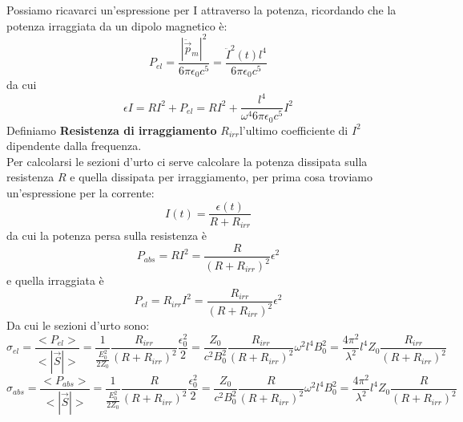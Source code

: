 \documentclass[twoside]{article}
\begin{document}
Possiamo ricavarci un'espressione per I attraverso la potenza, ricordando che la potenza irraggiata da un dipolo magnetico è:
\begin{equation}
    P_{el}=\frac{|\ddot{\vec{p}}_m|^2}{6\pi\epsilon_0c^5}=\frac{\ddot{I}^2(t)l^4}{6\pi\epsilon_0c^5}
\end{equation}
da cui
\begin{equation}
    \epsilon I=RI^2+P_{el}=RI^2+\frac{l^4}{\omega^4 6\pi\epsilon_0c^5}I^2
\end{equation}
Definiamo \textbf{Resistenza di irraggiamento} $R_{irr}$l'ultimo coefficiente di $I^2$ dipendente dalla frequenza. \\
Per calcolarsi le sezioni d'urto ci serve calcolare la potenza dissipata sulla resistenza $R$ e quella dissipata per irraggiamento, per prima cosa troviamo un'espressione per la corrente:
\begin{equation}
    I(t)=\frac{\epsilon(t)}{R+R_{irr}}
\end{equation}
da cui la potenza persa sulla resistenza è
\begin{equation}
    P_{abs}=RI^2=\frac{R}{(R+R_{irr})^2}\epsilon^2
\end{equation}
e quella irraggiata è
\begin{equation}
    P_{el}=R_{irr}I^2=\frac{R_{irr}}{(R+R_{irr})^2}\epsilon^2
\end{equation}
Da cui le sezioni d'urto sono:
\begin{equation}
    \sigma_{el}=\frac{<P_{el}>}{<|\vec{S}|>}=\frac{1}{\frac{E_0^2}{2Z_0}}\frac{R_{irr}}{(R+R_{irr})^2}\frac{\epsilon_0^2}{2}=\frac{Z_0}{c^2B_0^2}\frac{R_{irr}}{(R+R_{irr})^2}\omega^2l^4B_0^2=\frac{4\pi^2}{\lambda^2}l^4Z_0\frac{R_{irr}}{(R+R_{irr})^2}
\end{equation}
\begin{equation}
    \sigma_{abs}=\frac{<P_{abs}>}{<|\vec{S}|>}=\frac{1}{\frac{E_0^2}{2Z_0}}\frac{R}{(R+R_{irr})^2}\frac{\epsilon_0^2}{2}=\frac{Z_0}{c^2B_0^2}\frac{R}{(R+R_{irr})^2}\omega^2l^4B_0^2=\frac{4\pi^2}{\lambda^2}l^4Z_0\frac{R}{(R+R_{irr})^2}
\end{equation}
\end{document}
